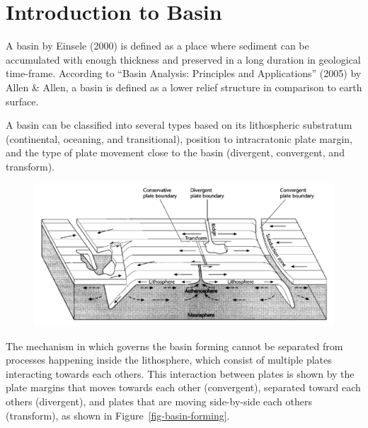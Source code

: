 \documentclass[
  letterpaper,
  DIV=11,
  numbers=noendperiod,
  oneside]{scrreprt}
\begin{document}

\hypertarget{introduction-to-basin}{%
\chapter{Introduction to Basin}\label{introduction-to-basin}}

A basin by Einsele (2000) is defined as a place where sediment can be
accumulated with enough thickness and preserved in a long duration in
geological time-frame. According to {``Basin Analysis: Principles and
Applications''} (2005) by Allen \& Allen, a basin is defined as a lower
relief structure in comparison to earth surface.

A basin can be classified into several types based on its lithospheric
substratum (continental, oceaning, and transitional), position to
intracratonic plate margin, and the type of plate movement close to the
basin (divergent, convergent, and transform).

\begin{figure}


\includegraphics[width=6.86458in,height=\textheight]{./images/paste-4BA6D504.png} \hfill{}

\end{figure}

The mechanism in which governs the basin forming cannot be separated
from processes happening inside the lithosphere, which consist of
multiple plates interacting towards each others. This interaction
between plates is shown by the plate margins that moves towards each
other (convergent), separated toward each others (divergent), and plates
that are moving side-by-side each others (transform), as shown in
Figure~\ref{fig-basin-forming}.
\end{document}
